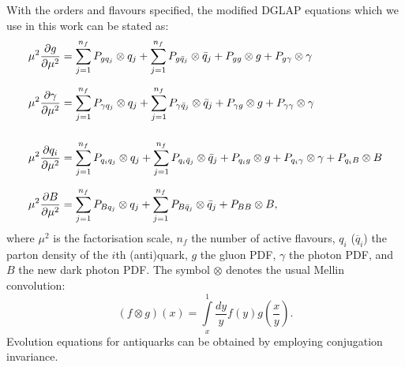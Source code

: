 \documentclass[withindex,glossary]{cam-thesis}
\begin{document}
With the orders and flavours specified, the modified DGLAP equations which we use in this work can be stated as: 
%
\begin{align}
\label{eq:basicdglap}
\mu^2 \frac{\partial g}{\partial \mu^2} &= \sum_{j=1}^{n_f} P_{gq_j} \otimes q_j +\sum_{j=1}^{n_f} P_{g\bar{q}_j} \otimes \bar{q}_j + P_{gg}\otimes g + P_{g\gamma}\otimes \gamma \notag\\[1.5ex]
\mu^2 \frac{\partial \gamma}{\partial \mu^2} &= \sum_{j=1}^{n_f} P_{\gamma q_j} \otimes q_j +\sum_{j=1}^{n_f} P_{\gamma\bar{q}_j} \otimes \bar{q}_j + P_{\gamma g}\otimes g + P_{\gamma\gamma}\otimes\gamma\notag \\
\\[-0.5ex]
\mu^2 \frac{\partial q_i}{\partial \mu^2} &= \sum_{j=1}^{n_f} P_{q_iq_j} \otimes q_j +\sum_{j=1}^{n_f} P_{q_i\bar{q}_j} \otimes \bar{q}_j + P_{q_ig}\otimes g + P_{q_i\gamma}\otimes \gamma + P_{q_iB} \otimes B \notag\\[1.5ex]
\mu^2 \frac{\partial B}{\partial \mu^2} &= \sum_{j=1}^{n_f} P_{Bq_j} \otimes q_j +\sum_{j=1}^{n_f} P_{B\bar{q}_j} \otimes \bar{q}_j + P_{BB}\otimes B,\notag
\end{align}
%
where $\mu^2$ is the factorisation scale, $n_f$ the number of active
flavours, $q_i$ ($\overline{q}_i$) the parton density of the $i$th (anti)quark, $g$ the gluon PDF, $\gamma$ the photon PDF, and
$B$ the new dark photon PDF. The symbol $\otimes$ denotes the usual Mellin convolution:
\begin{equation}
\label{eq:convolution}
(f \otimes g)(x) = \int\limits_{x}^{1} \frac{dy}{y} f(y) g\left( \frac{x}{y} \right).
\end{equation}
 Evolution equations for antiquarks can be obtained by employing conjugation
invariance. 
\end{document}
